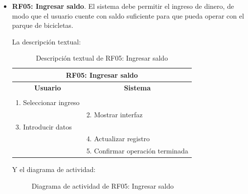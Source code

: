 \begin{itemize}
	\FloatBarrier
	\item \textbf{RF05: Ingresar saldo}. El sistema debe permitir el ingreso de dinero, de modo que el usuario cuente con saldo suficiente para que pueda operar con el parque de bicicletas.
	
	La descripción textual:
	\begin{table}[h]
		\centering	
		\begin{tabular}{|l|l|}
			\hline
			\multicolumn{2}{|c|}{\textbf{RF05: Ingresar saldo}} \\ \hline
			\multicolumn{1}{|c|}{\textbf{Usuario}} & \multicolumn{1}{c|}{\textbf{Sistema}} \\ \hline
			[Pto. inclusión: RF02: Loguear usuario] &\\ \hline
			1. Seleccionar ingreso &\\ \hline
			& 2. Mostrar interfaz \\ \hline
			3. Introducir datos &\\ \hline
			& 4. Actualizar registro \\ \hline
			& 5. Confirmar operación terminada \\ \hline 	
		\end{tabular}
		\caption{Descripción textual de RF05: Ingresar saldo}
		\label{tab:tablaDescTextualRF05}
	\end{table}
	
	Y el diagrama de actividad:
	\begin{figure}[!htb]
		\centering
		\caption{Diagrama de actividad de RF05: Ingresar saldo}
		\label{fig:diagramaActividad_RF05}
	\end{figure}
	

\end{itemize}
